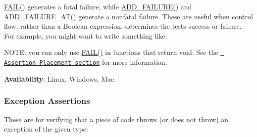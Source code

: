 {\ttfamily \mbox{\hyperlink{googletest-master_2googletest_2include_2gtest_2gtest_8h_a3e26a8d27caa386ed0ea7ce9d5b7c4ed}{F\+A\+I\+L()}}} generates a fatal failure, while {\ttfamily \mbox{\hyperlink{googletest-master_2googletest_2include_2gtest_2gtest_8h_adc16b5b0a740c39084ea5c9e960e3063}{A\+D\+D\+\_\+\+F\+A\+I\+L\+U\+R\+E()}}} and {\ttfamily \mbox{\hyperlink{googletest-master_2googletest_2include_2gtest_2gtest_8h_a448d7e5105b640e892fd8153fbee0b7f}{A\+D\+D\+\_\+\+F\+A\+I\+L\+U\+R\+E\+\_\+\+A\+T()}}} generate a nonfatal failure. These are useful when control flow, rather than a Boolean expression, determines the test\textquotesingle{}s success or failure. For example, you might want to write something like\+:


\begin{DoxyCode}{0}
\DoxyCodeLine{\}}
\end{DoxyCode}


N\+O\+TE\+: you can only use {\ttfamily \mbox{\hyperlink{googletest-master_2googletest_2include_2gtest_2gtest_8h_a3e26a8d27caa386ed0ea7ce9d5b7c4ed}{F\+A\+I\+L()}}} in functions that return {\ttfamily void}. See the \href{\#assertion-placement}{\texttt{ Assertion Placement section}} for more information.

{\bfseries{Availability}}\+: Linux, Windows, Mac.

\subsubsection*{Exception Assertions}

These are for verifying that a piece of code throws (or does not throw) an exception of the given type\+:

